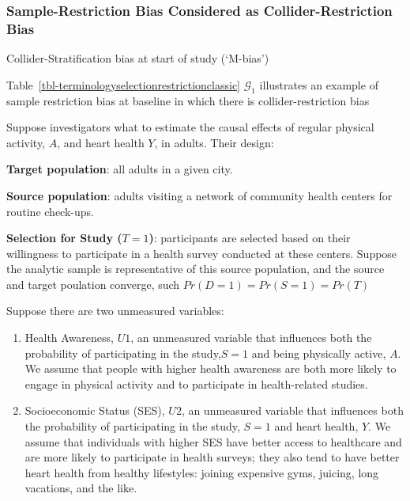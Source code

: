 \documentclass[
  single column]{article}
\begin{document}
\subsubsection{Sample-Restriction Bias Considered as
Collider-Restriction
Bias}\label{sample-restriction-bias-considered-as-collider-restriction-bias}

\begin{table}

\caption{\label{tbl-terminologyselectionrestrictionclassic}Collider-Stratification
bias at start of study (`M-bias')}

\centering{

\terminologyselectionrestrictionclassic

}

\end{table}%

Table~\ref{tbl-terminologyselectionrestrictionclassic} \(\mathcal{G}_1\)
illustrates an example of sample restriction bias at baseline in which
there is collider-restriction bias

Suppose investigators what to estimate the causal effects of regular
physical activity, \(A\), and heart health \(Y\), in adults. Their
design:

\textbf{Target population}: all adults in a given city.

\textbf{Source population}: adults visiting a network of community
health centers for routine check-ups.

\textbf{Selection for Study (\(T = 1\))}: participants are selected
based on their willingness to participate in a health survey conducted
at these centers. Suppose the analytic sample is representative of this
source population, and the source and target poulation converge, such
\(Pr(D = 1) = Pr(S = 1) = Pr(T)\)

Suppose there are two unmeasured variables:

\begin{enumerate}
\def\labelenumi{\arabic{enumi}.}
\item
  Health Awareness, \(U1\), an unmeasured variable that influences both
  the probability of participating in the study,\(\boxed{S = 1}\) and
  being physically active, \(A\). We assume that people with higher
  health awareness are both more likely to engage in physical activity
  and to participate in health-related studies.
\item
  Socioeconomic Status (SES), \(U2\), an unmeasured variable that
  influences both the probability of participating in the study,
  \(\boxed{S = 1}\) and heart health, \(Y\). We assume that individuals
  with higher SES have better access to healthcare and are more likely
  to participate in health surveys; they also tend to have better heart
  health from healthy lifestyles: joining expensive gyms, juicing, long
  vacations, and the like.
\end{enumerate}
\end{document}
